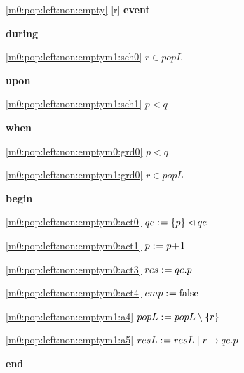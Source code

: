 \noindent \ref{m0:pop:left:non:empty} [r] \textbf{event}
\begin{block}
  \item   \textbf{during}
  \begin{block}
  \item[ \eqref{m0:pop:left:non:emptym1:sch0} ]$r \in popL $ %
  \end{block}
  \item   \textbf{upon}
  \begin{block}
  \item[ \eqref{m0:pop:left:non:emptym1:sch1} ]$p < q $ %
  \end{block}
  \item   \textbf{when}
  \begin{block}
  \item[ \eqref{m0:pop:left:non:emptym0:grd0} ]$p < q $ %
  \item[ \eqref{m0:pop:left:non:emptym1:grd0} ]$r \in popL $ %
  \end{block}
  \item   \textbf{begin}
  \begin{block}
  \item[ \eqref{m0:pop:left:non:emptym0:act0} ]$qe \mathrel{:\mkern1mu=} \{ p \} \mathbin{\lhd\mkern-14mu-} qe $ %
  \item[ \eqref{m0:pop:left:non:emptym0:act1} ]$p \mathrel{:\mkern1mu=} p\! + \!1 $ %
  \item[ \eqref{m0:pop:left:non:emptym0:act3} ]$res \mathrel{:\mkern1mu=} qe.p $ %
  \item[ \eqref{m0:pop:left:non:emptym0:act4} ]$emp \mathrel{:\mkern1mu=} \text{false} $ %
  \item[ \eqref{m0:pop:left:non:emptym1:a4} ]$popL \mathrel{:\mkern1mu=} popL \setminus \{ r \} $ %
  \item[ \eqref{m0:pop:left:non:emptym1:a5} ]$resL \mathrel{:\mkern1mu=} resL \; | \; r \mathbin\rightarrow qe.p $ %
  \end{block}
  \item   \textbf{end} \\
\end{block}
